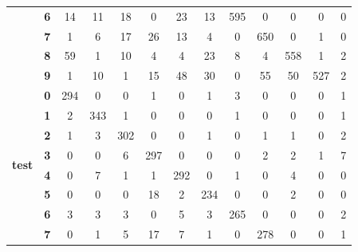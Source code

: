 \begin{table}[htp]
\begin{tabular}{|c|c|c|c|c|c|c|c|c|c|c|c|c|}
		& \textbf{6} & 14         & 11         & 18         & 0          & 23         & 13         & 595        & 0          & 0          & 0          & 0                \\ \cline{2-13} 
		& \textbf{7} & 1          & 6          & 17         & 26         & 13         & 4          & 0          & 650        & 0          & 1          & 0                \\ \cline{2-13} 
		& \textbf{8} & 59         & 1          & 10         & 4          & 4          & 23         & 8          & 4          & 558        & 1          & 2                \\ \cline{2-13} 
		& \textbf{9} & 1          & 10         & 1          & 15         & 48         & 30         & 0          & 55         & 50         & 527        & 2                \\ \hline
		\multirow{10}{*}{\textbf{test}}     & \textbf{0} & 294        & 0          & 0          & 1          & 0          & 1          & 3          & 0          & 0          & 0          & 1                \\ \cline{2-13} 
		& \textbf{1} & 2          & 343        & 1          & 0          & 0          & 0          & 1          & 0          & 0          & 0          & 1                \\ \cline{2-13} 
		& \textbf{2} & 1          & 3          & 302        & 0          & 0          & 1          & 0          & 1          & 1          & 0          & 2                \\ \cline{2-13} 
		& \textbf{3} & 0          & 0          & 6          & 297        & 0          & 0          & 0          & 2          & 2          & 1          & 7                \\ \cline{2-13} 
		& \textbf{4} & 0          & 7          & 1          & 1          & 292        & 0          & 1          & 0          & 4          & 0          & 0                \\ \cline{2-13} 
		& \textbf{5} & 0          & 0          & 0          & 18         & 2          & 234        & 0          & 0          & 2          & 0          & 0                \\ \cline{2-13} 
		& \textbf{6} & 3          & 3          & 3          & 0          & 5          & 3          & 265        & 0          & 0          & 0          & 2                \\ \cline{2-13} 
		& \textbf{7} & 0          & 1          & 5          & 17         & 7          & 1          & 0          & 278        & 0          & 0          & 1                \\ \cline{2-13} 

\end{tabular}
\end{table}
